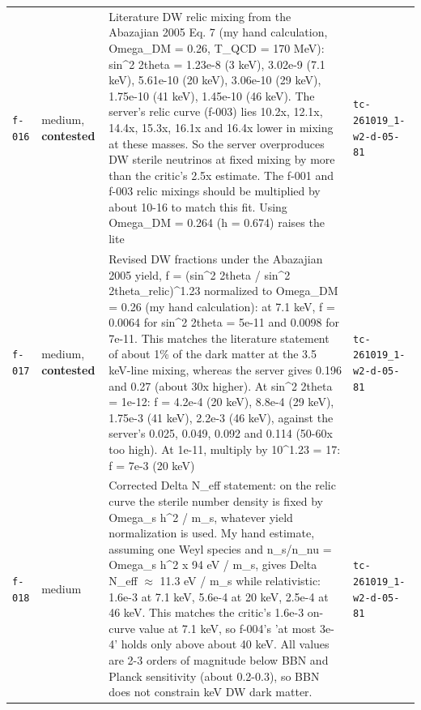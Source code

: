 \documentclass[11pt,a4paper]{article}
\begin{document}
\begin{longtable}{@{}p{}p{}p{}p{}@{}}
\texttt{f-016} & medium, \textbf{contested} & Literature DW relic mixing from the Abazajian 2005 Eq. 7 (my hand calculation, Omega\_DM = 0.26, T\_QCD = 170 MeV): sin\textasciicircum{}2 2theta = 1.23e-8 (3 keV), 3.02e-9 (7.1 keV), 5.61e-10 (20 keV), 3.06e-10 (29 keV), 1.75e-10 (41 keV), 1.45e-10 (46 keV). The server's relic curve (f-003) lies 10.2x, 12.1x, 14.4x, 15.3x, 16.1x and 16.4x lower in mixing at these masses. So the server overproduces DW sterile neutrinos at fixed mixing by more than the critic's 2.5x estimate. The f-001 and f-003 relic mixings should be multiplied by about 10-16 to match this fit. Using Omega\_DM = 0.264 (h = 0.674) raises the lite & \texttt{tc-261019\_\allowbreak{}1-w2-d-05-81} \\
\texttt{f-017} & medium, \textbf{contested} & Revised DW fractions under the Abazajian 2005 yield, f = (sin\textasciicircum{}2 2theta / sin\textasciicircum{}2 2theta\_relic)\textasciicircum{}1.23 normalized to Omega\_DM = 0.26 (my hand calculation): at 7.1 keV, f = 0.0064 for sin\textasciicircum{}2 2theta = 5e-11 and 0.0098 for 7e-11. This matches the literature statement of about 1\% of the dark matter at the 3.5 keV-line mixing, whereas the server gives 0.196 and 0.27 (about 30x higher). At sin\textasciicircum{}2 2theta = 1e-12: f = 4.2e-4 (20 keV), 8.8e-4 (29 keV), 1.75e-3 (41 keV), 2.2e-3 (46 keV), against the server's 0.025, 0.049, 0.092 and 0.114 (50-60x too high). At 1e-11, multiply by 10\textasciicircum{}1.23 = 17: f = 7e-3 (20 keV)  & \texttt{tc-261019\_\allowbreak{}1-w2-d-05-81} \\
\texttt{f-018} & medium & Corrected Delta N\_eff statement: on the relic curve the sterile number density is fixed by Omega\_s h\textasciicircum{}2 / m\_s, whatever yield normalization is used. My hand estimate, assuming one Weyl species and n\_s/n\_nu = Omega\_s h\textasciicircum{}2 x 94 eV / m\_s, gives Delta N\_eff $\approx$ 11.3 eV / m\_s while relativistic: 1.6e-3 at 7.1 keV, 5.6e-4 at 20 keV, 2.5e-4 at 46 keV. This matches the critic's 1.6e-3 on-curve value at 7.1 keV, so f-004's 'at most 3e-4' holds only above about 40 keV. All values are 2-3 orders of magnitude below BBN and Planck sensitivity (about 0.2-0.3), so BBN does not constrain keV DW dark matter. & \texttt{tc-261019\_\allowbreak{}1-w2-d-05-81} \\
\bottomrule\end{longtable}
\end{document}
